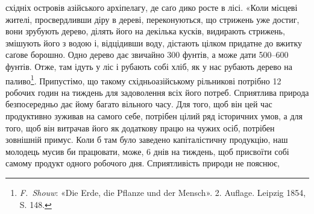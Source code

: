 східніх островів азійського архіпелагу, де саґо дико росте в лісі.
«Коли місцеві жителі, просвердливши діру в дереві, переконуються,
що стрижень уже достиг, вони зрубують дерево, ділять
його на декілька кусків, видирають стрижень, змішують його
з водою і, відцідивши воду, дістають цілком придатне до вжитку
саґове борошно. Одно дерево дає звичайно 300 фунтів, а може
дати 500--600 фунтів. Отже, там ідуть у ліс і рубають собі хліб,
як у нас рубають дерево на паливо\footnote{
\emph{F.~Shouw}: «Die Erde, die Pflanze und der Mensch». 2. Auflage. Leipzig
1854, S. 148.
}. Припустімо, що такому
східньоазійському рільникові потрібно 12 робочих годин на
тиждень для задоволення всіх його потреб. Сприятлива природа
безпосередньо дає йому багато вільного часу. Для того, щоб він
цей час продуктивно зуживав на самого себе, потрібен цілий ряд
історичних умов, а для того, щоб він витрачав його як додаткову
працю на чужих осіб, потрібен зовнішній примус. Коли б там
було заведено капіталістичну продукцію, наш молодець мусив би
працювати, може, 6 днів на тиждень, щоб присвоїти собі самому
продукт одного робочого дня. Сприятливість природи не пояснює,
\parbreak{}  %
